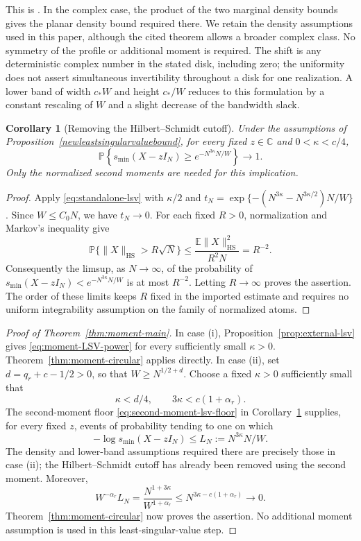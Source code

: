 \documentclass[11pt,reqno]{amsart}
\numberwithin{equation}{section}
\theoremstyle{plain}
\newtheorem{corollary}[theorem]{Corollary}
\theoremstyle{definition}
\theoremstyle{remark}
\begin{document}
This is \cite[Theorem~3.1]{han2026optimal}. In the complex case, the
product of the two marginal density bounds gives the planar density
bound required there. We retain the density assumptions used in this
paper, although the cited theorem allows a broader complex class.
No symmetry of the profile or additional moment is required. The shift
is any deterministic complex number in the stated disk, including zero;
the uniformity does not assert simultaneous invertibility throughout a
disk for one realization. A lower band of width $c_*W$ and height
$c_*/W$ reduces to this formulation by a constant rescaling of $W$
and a slight decrease of the bandwidth slack.

\begin{corollary}[Removing the Hilbert--Schmidt cutoff]
\label{cor:polynomial-norm-lsv}
Under the assumptions of Proposition~\ref{newleastsingularvaluebound},
for every fixed $z\in\mathbb C$ and $0<\kappa<c/4$,
\begin{equation}\label{eq:second-moment-lsv-floor}
 \mathbb P\left\{s_{\min}(X-zI_N)
 \ge e^{-N^{3\kappa}N/W}\right\}\longrightarrow1.
\end{equation}
Only the normalized second moments are needed for this implication.
\end{corollary}

\begin{proof}
Apply \eqref{eq:standalone-lsv} with $\kappa/2$ and
$t_N=\exp\{-(N^{3\kappa}-N^{3\kappa/2})N/W\}$.
Since $W\le C_0N$, we have $t_N\to0$. For each fixed $R>0$,
normalization and Markov's inequality give
\[
 \mathbb P\{\|X\|_{\mathrm{HS}}>R\sqrt N\}
 \le\frac{\mathbb E\|X\|_{\mathrm{HS}}^2}{R^2N}=R^{-2}.
\]
Consequently the limsup, as $N\to\infty$, of the probability of
$s_{\min}(X-zI_N)<e^{-N^{3\kappa}N/W}$ is at most $R^{-2}$.
Letting $R\to\infty$ proves the assertion. The order of these limits
keeps $R$ fixed in the imported estimate and requires no uniform
integrability assumption on the family of normalized atoms.
\end{proof}

\begin{proof}[Proof of Theorem~\ref{thm:moment-main}]
In case \textup{(i)}, Proposition~\ref{prop:external-lsv} gives
\eqref{eq:moment-LSV-power} for every sufficiently small $\kappa>0$.
Theorem~\ref{thm:moment-circular} applies directly.
In case \textup{(ii)}, set $d=q_r+c-1/2>0$, so that
$W\ge N^{1/2+d}$.  Choose a fixed $\kappa>0$ sufficiently small that
\[
 \kappa<d/4,\qquad 3\kappa<c(1+\alpha_r).
\]
The second-moment floor \eqref{eq:second-moment-lsv-floor} in
Corollary~\ref{cor:polynomial-norm-lsv} supplies, for every fixed $z$,
events of probability tending to one on which
\[
 -\log s_{\min}(X-zI_N)\le L_N:=N^{3\kappa}N/W.
\]
The density and lower-band assumptions required there are precisely
those in case \textup{(ii)}; the Hilbert--Schmidt cutoff has already been
removed using the second moment.  Moreover,
\[
 W^{-\alpha_r}L_N
 =\frac{N^{1+3\kappa}}{W^{1+\alpha_r}}
 \le N^{3\kappa-c(1+\alpha_r)}\longrightarrow0.
\]
Theorem~\ref{thm:moment-circular} now proves the assertion.  No additional
moment assumption is used in this least-singular-value step.
\end{proof}
\end{document}
